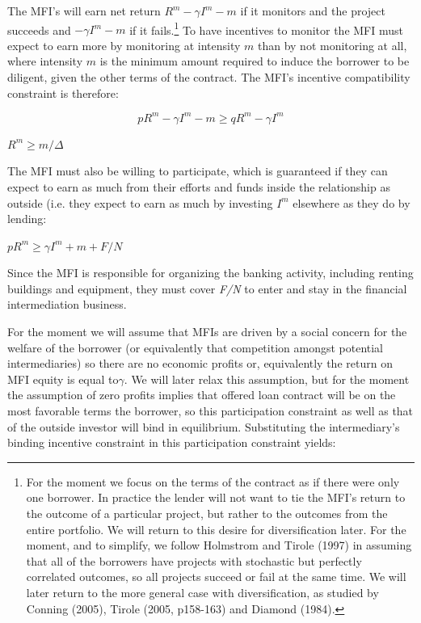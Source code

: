 \documentclass[
]{article}
\begin{document}
The MFI's will earn net return \(R^{m} - \gamma I^{m} - m\) if it
monitors and the project succeeds and \(- \gamma I^{m} - m\) if it
fails.\footnote{For the moment we focus on the terms of the contract as
  if there were only one borrower. In practice the lender will not want
  to tie the MFI's return to the outcome of a particular project, but
  rather to the outcomes from the entire portfolio. We will return to
  this desire for diversification later. For the moment, and to
  simplify, we follow Holmstrom and Tirole (1997) in assuming that all
  of the borrowers have projects with stochastic but perfectly
  correlated outcomes, so all projects succeed or fail at the same time.
  We will later return to the more general case with diversification, as
  studied by Conning (2005), Tirole (2005, p158-163) and Diamond (1984).}
To have incentives to monitor the MFI must expect to earn more by
monitoring at intensity \(m\) than by not monitoring at all, where
intensity \(m\) is the minimum amount required to induce the borrower to
be diligent, given the other terms of the contract. The MFI's incentive
compatibility constraint is therefore:

\[pR^{m} - \gamma I^{m} - m \geq qR^{m} - \gamma I^{m}\]

\(R^{m} \geq m/\Delta\)

The MFI must also be willing to participate, which is guaranteed if they
can expect to earn as much from their efforts and funds inside the
relationship as outside (i.e. they expect to earn as much by investing
\(I^{m}\) elsewhere as they do by lending:

\(pR^{m} \geq \gamma I^{m} + m + F/N\)

Since the MFI is responsible for organizing the banking activity,
including renting buildings and equipment, they must cover \emph{F/N} to
enter and stay in the financial intermediation business.

For the moment we will assume that MFIs are driven by a social concern
for the welfare of the borrower (or equivalently that competition
amongst potential intermediaries) so there are no economic profits or,
equivalently the return on MFI equity is equal to\(\gamma\). We will
later relax this assumption, but for the moment the assumption of zero
profits implies that offered loan contract will be on the most favorable
terms the borrower, so this participation constraint as well as that of
the outside investor will bind in equilibrium. Substituting the
intermediary's binding incentive constraint in this participation
constraint yields:
\end{document}
